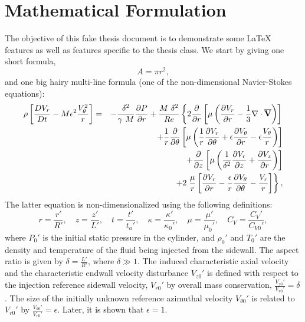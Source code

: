 \chapter{Mathematical Formulation}
\label{mathchapter}

The objective of this fake thesis document is to demonstrate some
\LaTeX{} features as well as features specific to the thesis class.
We start by giving one short formula, 
\begin{equation}
	A = \pi r^2,
\end{equation}
and one big hairy multi-line
formula (one of the non-dimensional Navier-Stokes equations):
\begin{eqnarray}
  \rho \left[ \frac{DV_r}{Dt} - M \epsilon^2
    \frac{V_\theta^2}{r} \right]
  & = & -\frac{\delta^2}{\gamma~ M} \frac{\partial P}{\partial r}
	+ \frac{M ~\delta^2}{Re} \left\{ 2 \frac{\partial }{\partial r}
	\left[ \mu \left( \frac{\partial V_r}{\partial r}
        - \frac{1}{3} {\bf \nabla \cdot \overline{V}}
      \right) \right] \right. \nonumber \\
  & & + \frac{1}{r} \frac{\partial }{\partial \theta} \left[ \mu \left(
      \frac{1}{r} \frac{\partial V_r}{\partial \theta} + \epsilon \frac{\partial V_{\theta}}{\partial r}
      - \epsilon \frac{V_{\theta}}{r} \right) \right] \nonumber \\
  & & + \frac{\partial }{\partial z} \left[ \mu \left( \frac{1}{\delta^2}
        \frac{\partial V_r}{\partial z} + \frac{\partial V_z}{\partial r} \right) \right] \nonumber \\
  & & + 2 \left. \frac{\mu}{r}\left[ \frac{\partial V_r}{\partial r} -\frac{\epsilon}{r}
      \frac{\partial V_{\theta}}{\partial \theta} - \frac{V_r}r\right] \right\}, \label{eq:rmom}
\end{eqnarray}
The latter equation is non-dimensionalized using the following definitions:
\begin{displaymath}
	r = \frac{r'}{R'}, \quad
	z = \frac{z'}{L'}, \quad
	t = \frac{t'}{t_a'}, \quad
	\kappa = \frac{\kappa'}{\kappa_0'}, \quad
	\mu = \frac{\mu'}{\mu_0'} , \quad
	C_V = \frac{C_V'}{C_{V0}'},
      \end{displaymath}
where $P_0'$ is the initial static pressure in the cylinder,
and $\rho_0'$ and $T_0'$ are the density and temperature
of the fluid being injected from the sidewall.
The aspect ratio is given by $\delta = \frac{L'}{R'}$,
where $\delta \gg 1$.
The induced characteristic axial velocity and the characteristic
endwall velocity disturbance $V_{z0}'$ is defined with respect
to the injection reference sidewall velocity,
$V_{r0}'$ by overall mass conservation,
$\frac{V_{z0}'}{V_{r0}'} = \delta$.
The size of the initially unknown reference
azimuthal velocity $V_{\theta 0}'$ is related to
$V_{r0}'$ by $\frac{V_{\theta 0}'}{V_{r0}'}=\epsilon$.
Later, it is shown that $\epsilon=1$.

